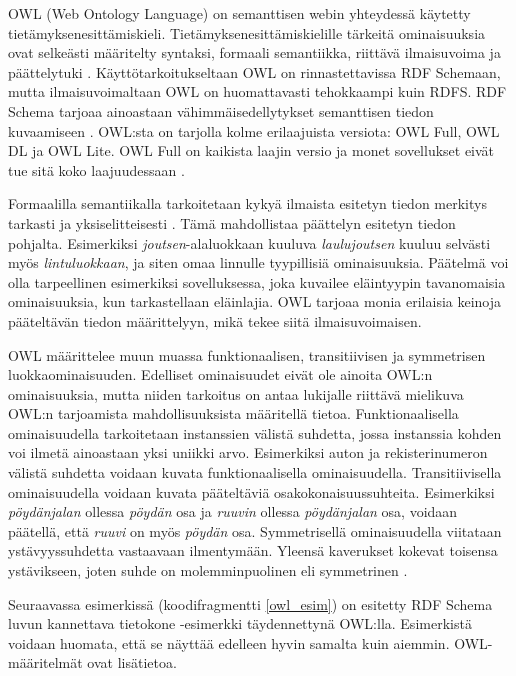 \documentclass[finnish, 12pt, a4paper, elec, utf8, pdfa, online]{aaltothesis}
\begin{document}
{OWL (Web Ontology Language) on semanttisen webin yhteydessä käytetty tietämyksenesittämiskieli. Tietämyksenesittämiskielille tärkeitä ominaisuuksia ovat selkeästi määritelty syntaksi, formaali semantiikka, riittävä ilmaisuvoima ja päättelytuki \cite{Antoniou}. Käyttötarkoitukseltaan OWL on rinnastettavissa RDF Schemaan, mutta ilmaisuvoimaltaan OWL on huomattavasti tehokkaampi kuin RDFS. RDF Schema tarjoaa ainoastaan vähimmäisedellytykset semanttisen tiedon kuvaamiseen \cite{revisited}. OWL:sta on tarjolla kolme erilaajuista versiota: OWL Full, OWL DL ja OWL Lite. OWL Full on kaikista laajin versio ja monet sovellukset eivät tue sitä koko laajuudessaan \cite{OWL_specification}.

Formaalilla semantiikalla tarkoitetaan kykyä ilmaista esitetyn tiedon merkitys tarkasti ja yksiselitteisesti \cite{Antoniou}. Tämä mahdollistaa päättelyn esitetyn tiedon pohjalta. Esimerkiksi \textit{joutsen}-alaluokkaan kuuluva \textit{laulujoutsen} kuuluu selvästi myös \textit{lintuluokkaan}, ja siten omaa linnulle tyypillisiä ominaisuuksia. Päätelmä voi olla tarpeellinen esimerkiksi sovelluksessa, joka kuvailee eläintyypin tavanomaisia ominaisuuksia, kun tarkastellaan eläinlajia. OWL tarjoaa monia erilaisia keinoja pääteltävän tiedon määrittelyyn, mikä tekee siitä ilmaisuvoimaisen.

OWL määrittelee muun muassa funktionaalisen, transitiivisen ja symmetrisen luokkaominaisuuden. Edelliset ominaisuudet eivät ole ainoita OWL:n ominaisuuksia, mutta niiden tarkoitus on antaa lukijalle riittävä mielikuva OWL:n tarjoamista mahdollisuuksista määritellä tietoa. Funktionaalisella ominaisuudella tarkoitetaan instanssien välistä suhdetta, jossa instanssia kohden voi ilmetä ainoastaan yksi uniikki arvo. Esimerkiksi auton ja rekisterinumeron välistä suhdetta voidaan kuvata funktionaalisella ominaisuudella. Transitiivisella ominaisuudella voidaan kuvata pääteltäviä osakokonaisuussuhteita. Esimerkiksi \textit{pöydänjalan} ollessa \textit{pöydän} osa ja \textit{ruuvin} ollessa \textit{pöydänjalan} osa, voidaan päätellä, että \textit{ruuvi} on myös \textit{pöydän} osa. Symmetrisellä ominaisuudella viitataan ystävyyssuhdetta vastaavaan ilmentymään. Yleensä kaverukset kokevat toisensa ystävikseen, joten suhde on molemminpuolinen eli symmetrinen \cite{OWL_specification}.

Seuraavassa esimerkissä (koodifragmentti \ref{owl_esim}) on esitetty RDF Schema luvun kannettava tietokone -esimerkki täydennettynä OWL:lla. Esimerkistä voidaan huomata, että se näyttää edelleen hyvin samalta kuin aiemmin. OWL-määritelmät ovat lisätietoa.
\enlargethispage{-2\baselineskip}

}
\end{document}
